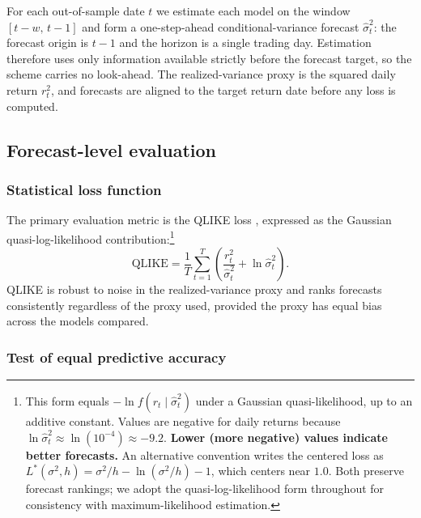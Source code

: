 For each out-of-sample date $t$ we estimate each model on the window $[t-w,\,t-1]$ and form a one-step-ahead conditional-variance forecast $\hat{\sigma}^2_t$: the forecast origin is $t-1$ and the horizon is a single trading day. Estimation therefore uses only information available strictly before the forecast target, so the scheme carries no look-ahead. The realized-variance proxy is the squared daily return $r^2_t$, and forecasts are aligned to the target return date before any loss is computed.

\subsection{Forecast-level evaluation}

\subsubsection{Statistical loss function}

The primary evaluation metric is the QLIKE loss \citep{patton2011}, expressed as the Gaussian quasi-log-likelihood contribution:\footnote{This form equals $-\ln f(r_t\mid\hat{\sigma}^2_t)$ under a Gaussian quasi-likelihood, up to an additive constant. Values are negative for daily returns because $\ln\hat{\sigma}^2_t\approx\ln(10^{-4})\approx-9.2$. \textbf{Lower (more negative) values indicate better forecasts.} An alternative convention writes the centered loss as $L^*(\sigma^2,h)=\sigma^2/h-\ln(\sigma^2/h)-1$, which centers near $1.0$. Both preserve forecast rankings; we adopt the quasi-log-likelihood form throughout for consistency with maximum-likelihood estimation.}
\begin{equation}
\text{QLIKE} = \frac{1}{T}\sum_{t=1}^{T}\left(\frac{r^2_t}{\hat{\sigma}^2_t} + \ln\hat{\sigma}^2_t\right).
\label{eq:qlike}
\end{equation}
QLIKE is robust to noise in the realized-variance proxy and ranks forecasts consistently regardless of the proxy used, provided the proxy has equal bias across the models compared.

\subsubsection{Test of equal predictive accuracy}

